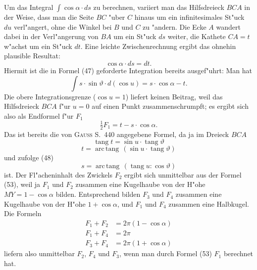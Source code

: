\documentclass[12pt,a4paper]{article}
\DeclareMathOperator{\tang}{tang}
\DeclareMathOperator{\arctang}{arc\,tang}
\theoremstyle{plain}
\theoremstyle{definition}
\theoremstyle{remark}
\begin{document}
Um das Integral $\int\!\cos \alpha \cdot ds$ zu berechnen, variiert man das Hilfsdreieck $BCA$ in der Weise, dass
man die Seite $BC$ "uber $C$ hinaus um ein infinitesimales St"uck $du$ verl"angert, ohne die Winkel bei $B$ und
$C$ zu "andern. Die Ecke $A$ wandert dabei in der Verl"angerung von $BA$ um ein St"uck $ds$ weiter, die
Kathete $CA = t$ w"achst um ein St"uck $dt$. Eine leichte Zwischenrechnung ergibt das ohnehin plausible
Resultat:
\begin{equation}\tag{51}
\cos \alpha \cdot ds = dt.
\end{equation}
Hiermit ist die in Formel (47) geforderte Integration bereits ausgef"uhrt: Man hat
\begin{equation}\tag{52}
\int\! s \cdot \sin \vartheta \cdot d(\cos u) = s \cdot \cos \alpha - t.
\end{equation}
Die obere Integrationsgrenze ($\cos u = 1$) liefert keinen Beitrag, weil das Hilfsdreieck $BCA$ f"ur $u = 0$
auf einen Punkt zusammenschrumpft; es ergibt sich also als Endformel f"ur $F_1$
\begin{equation}\tag{53}
\tfrac{1}{2} F_1 = t - s \cdot \cos \alpha.
\end{equation}
Das ist bereits die von \textsc{Gauss} S.~440 angegebene Formel, da ja im Dreieck $BCA$
\begin{equation}\tag{54}
\tang t = \sin u \cdot \tang \vartheta
\end{equation}
\begin{equation}\tag{55}
t = \arctang\,(\sin u \cdot \tang \vartheta)
\end{equation}
und zufolge (48)
\begin{equation}\tag{56}
s = \arctang\,(\tang u : \cos \vartheta)
\end{equation}
ist. Der Fl"acheninhalt des Zwickels $F_2$ ergibt sich unmittelbar aus der Formel (53), weil ja $F_1$ und $F_2$
zusammen eine Kugelhaube von der H"ohe $MY = 1 - \cos \alpha$ bilden. Entsprechend bilden $F_3$ und $F_4$
zusammen eine Kugelhaube von der H"ohe $1 + \cos \alpha$, und $F_1$ und $F_4$ zusammen eine Halbkugel. Die
Formeln
\begin{align}\tag{57}
F_1 + F_2 &= 2\pi(1 - \cos \alpha)\\ \tag{58}
F_1 + F_4 &= 2\pi\\ \tag{59}
F_3 + F_4 &= 2\pi(1 + \cos \alpha)
\end{align}
liefern also unmittelbar $F_2$, $F_4$ und $F_3$, wenn man durch Formel (53) $F_1$ berechnet hat.
\end{document}
